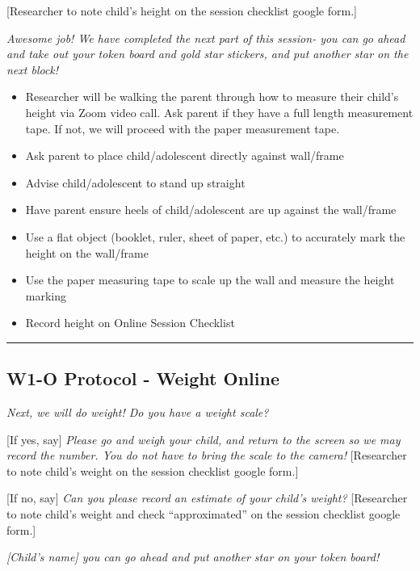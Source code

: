 \documentclass[]{book}
\providecommand{\tightlist}{%
  \setlength{\itemsep}{0pt}\setlength{\parskip}{0pt}}
\begin{document}
{[}Researcher to note child's height on the session checklist google form.{]}

\emph{Awesome job! We have completed the next part of this session- you can go ahead and take out your token board and gold star stickers, and put another star on the next block!}

\begin{itemize}
\tightlist
\item
  Researcher will be walking the parent through how to measure their child's height via Zoom video call. Ask parent if they have a full length measurement tape. If not, we will proceed with the paper measurement tape.
\item
  Ask parent to place child/adolescent directly against wall/frame
\item
  Advise child/adolescent to stand up straight
\item
  Have parent ensure heels of child/adolescent are up against the wall/frame
\item
  Use a flat object (booklet, ruler, sheet of paper, etc.) to accurately mark the height on the wall/frame
\item
  Use the paper measuring tape to scale up the wall and measure the height marking
\item
  Record height on Online Session Checklist
\end{itemize}

\begin{center}\rule{0.5\linewidth}{0.5pt}\end{center}

\hypertarget{w1-o-protocol---weight-online}{%
\subsection{W1-O Protocol - Weight Online}\label{w1-o-protocol---weight-online}}

\emph{Next, we will do weight! Do you have a weight scale?}

{[}If yes, say{]} \emph{Please go and weigh your child, and return to the screen so we may record the number. You do not have to bring the scale to the camera!} {[}Researcher to note child's weight on the session checklist google form.{]}

{[}If no, say{]} \emph{Can you please record an estimate of your child's weight?} {[}Researcher to note child's weight and check ``approximated'' on the session checklist google form.{]}

\emph{{[}Child's name{]} you can go ahead and put another star on your token board!}
\end{document}
